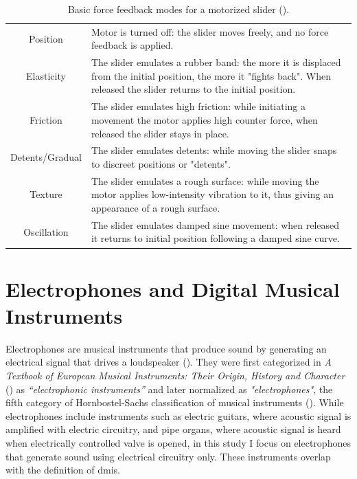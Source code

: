 \begin{table}[h!]
	\centering
	\begin{tabularx}{\textwidth}{ |c|X| }
		\hline
		\thead{Mode} & \thead{Description} \\
		\hline
		Position & Motor is turned off: the slider moves freely, and no force feedback is applied. \\
		\hline
		Elasticity & The slider emulates a rubber band: the more it is displaced from the initial position, the more it "fights back". When released the slider returns to the initial position. \\
		\hline
		Friction & The slider emulates high friction: while initiating a movement the motor applies high counter force, when released the slider stays in place. \\
		\hline
		Detents/Gradual & The slider emulates detents: while moving the slider snaps to discreet positions or "detents". \\
		\hline
		Texture & The slider emulates a rough surface: while moving the motor applies low-intensity vibration to it, thus giving an appearance of a rough surface. \\
		\hline
		Oscillation & The slider emulates damped sine movement: when released it returns to initial position following a damped sine curve. \\
		\hline
	\end{tabularx}
	\caption{Basic force feedback modes for a motorized slider (\cite{kretz2004, jenaro2007}).}
	\label{fjeldmodes}
\end{table}

\section{Electrophones and Digital Musical Instruments}

Electrophones are musical instruments that produce sound by generating an electrical signal that drives a loudspeaker (\cite{mimo2011}). They were first categorized in \textit{A Textbook of European Musical Instruments: Their Origin, History and Character} (\cite{galpin1937}) as \textit{“electrophonic instruments”} and later normalized as \textit{"electrophones"}, the fifth category of Hornbostel-Sachs classification of musical instruments (\cite{lee2019}). While electrophones include instruments such as electric guitars, where acoustic signal is amplified with electric circuitry, and pipe organs, where acoustic signal is heard when electrically controlled valve is opened, in this study I focus on electrophones that generate sound using electrical circuitry only. These instruments overlap with the definition of \glspl{dmi}.

